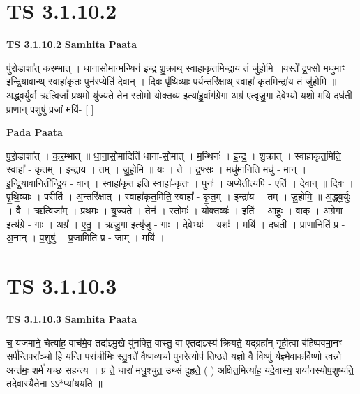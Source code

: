 \documentclass[17pt]{extarticle}
\begin{document}

\section{ TS 3.1.10.2 }

\textbf{TS 3.1.10.2 } \newline
\textbf{Samhita Paata} \newline

पु॑रो॒डाशा᳚त् कर॒म्भात् । धा॒ना॒सो॒मान्म॒न्थिन॑ इन्द्र शु॒क्राथ् स्वाहा॑कृत॒मिन्द्रा॑य॒ तं जु॑होमि ॥यस्ते᳚ द्र॒फ्सो मधु॑माꣳ इन्द्रि॒यावा॒न्थ् स्वाहा॑कृतः॒ पुन॑र॒प्येति॑ दे॒वान् । दि॒वः पृ॑थि॒व्याः पर्य॒न्तरि॑क्षा॒थ् स्वाहा॑ कृत॒मिन्द्रा॑य॒ तं जु॑होमि ॥ अ॒द्ध्व॒र्युर्वा ऋ॒त्विजां᳚ प्रथ॒मो यु॑ज्यते॒ तेन॒ स्तोमो॑ योक्त॒व्य॑ इत्या॑हु॒र्वाग॑ग्रे॒गा अग्र॑ एत्वृजु॒गा दे॒वेभ्यो॒ यशो॒ मयि॒ दध॑ती प्रा॒णान् प॒शुषु॑ प्र॒जां मयि॑- [  ] \newline

\textbf{Pada Paata} \newline

पु॒रो॒डाशा᳚त् । क॒र॒म्भात् ॥ धा॒ना॒सो॒मादिति॑ धाना-सो॒मात् । म॒न्थिनः॑ । इ॒न्द्र॒ । शु॒क्रात् । स्वाहा॑कृत॒मिति॒ स्वाहा᳚ - कृ॒त॒म् । इन्द्रा॑य । तम् । जु॒हो॒मि॒ ॥ यः । ते॒ । द्र॒फ्सः । मधु॑मा॒निति॒ मधु॑ - मा॒न् । इ॒न्द्रि॒यावा॒निती᳚न्द्रि॒य - वा॒न् । स्वाहा॑कृत॒ इति स्वाहा᳚-कृ॒तः॒ । पुनः॑ । अ॒प्येतीत्य॑पि - एति॑ । दे॒वान् ॥ दि॒वः । पृ॒थि॒व्याः । परीति॑ । अ॒न्तरि॑क्षात् । स्वाहा॑कृत॒मिति॒ स्वाहा᳚ - कृ॒त॒म् । इन्द्रा॑य । तम् । जु॒हो॒मि॒ ॥ अ॒द्ध्व॒र्युः । वै । ऋ॒त्विजा᳚म् । प्र॒थ॒मः । यु॒ज्य॒ते॒ । तेन॑ । स्तोमः॑ । यो॒क्त॒व्यः॑ । इति॑ । आ॒हुः॒ । वाक् । अ॒ग्रे॒गा इत्य॑ग्रे - गाः । अग्र᳚ । ए॒तु॒ । ऋ॒जु॒गा इत्यृ॑जु - गाः । दे॒वेभ्यः॑ । यशः॑ । मयि॑ । दध॑ती । प्रा॒णानिति॑ प्र - अ॒नान् । प॒शुषु॑ । प्र॒जामिति॑ प्र - जाम् । मयि॑ ।  \newline





\section{ TS 3.1.10.3 }

\textbf{TS 3.1.10.3 } \newline
\textbf{Samhita Paata} \newline

च॒ यज॑माने॒ चेत्या॑ह॒ वाच॑मे॒व तद्य॑ज्ञ्मु॒खे यु॑नक्ति॒ वास्तु॒ वा ए॒तद्य॒ज्ञ्स्य॑ क्रियते॒ यद्ग्रहा᳚न् गृही॒त्वा ब॑हिष्पवमा॒नꣳ सर्प॑न्ति॒परा᳚ञ्चो॒ हि यन्ति॒ परा॑चीभिः स्तु॒वते॑ वैष्ण॒व्यर्चा पुन॒रेत्योप॑ तिष्ठते य॒ज्ञो वै विष्णु॑ र्य॒ज्ञ्मे॒वाक॒र्विष्णो॒ त्वन्नो॒ अन्त॑मः॒ शर्म॑ यच्छ सहन्त्य । प्र ते॒ धारा॑ मधु॒श्चुत॒ उथ्सं॑ दुह्रते॒ ( ) अक्षि॑त॒मित्या॑ह॒ यदे॒वास्य॒ शया॑नस्योप॒शुष्य॑ति॒ तदे॒वास्यै॒तेना ऽऽ*प्या॑ययति ॥ \newline
\end{document}
